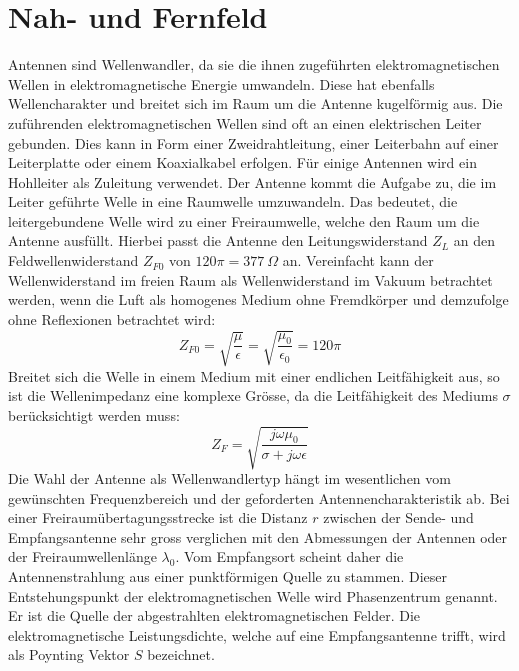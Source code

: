 \newpage
\section{Nah- und Fernfeld}\label{sec:NahundFern}
Antennen sind Wellenwandler, da sie die ihnen zugeführten elektromagnetischen Wellen in elektromagnetische Energie umwandeln. Diese hat ebenfalls Wellencharakter und breitet sich im Raum um die Antenne kugelförmig aus. Die zuführenden elektromagnetischen Wellen sind oft an einen elektrischen Leiter gebunden. Dies kann in Form einer Zweidrahtleitung, einer Leiterbahn auf einer Leiterplatte oder einem Koaxialkabel erfolgen. Für einige Antennen wird ein Hohlleiter als Zuleitung verwendet. 
Der Antenne kommt die Aufgabe zu, die im Leiter geführte Welle in eine Raumwelle umzuwandeln. Das bedeutet, die leitergebundene Welle wird zu einer Freiraumwelle, welche den Raum um die Antenne ausfüllt.
Hierbei passt die Antenne den Leitungswiderstand $Z_{L}$ an den Feldwellenwiderstand $Z_{F0}$ von $120\pi = 377 \ \Omega$ an. Vereinfacht kann der Wellenwiderstand im freien Raum als Wellenwiderstand im Vakuum betrachtet werden, wenn die Luft als homogenes Medium ohne Fremdkörper und demzufolge ohne Reflexionen betrachtet wird:
\begin{equation}\label{eq:Wellenimpedanz}
Z_{F0}=\sqrt{\dfrac{\mu}{\epsilon}}=\sqrt{\dfrac{\mu_{0}}{\epsilon_{0}}}=120\pi
\end{equation}
Breitet sich die Welle in einem Medium mit einer endlichen Leitfähigkeit aus, so ist die Wellenimpedanz eine komplexe Grösse, da die Leitfähigkeit des Mediums $\sigma$ berücksichtigt werden muss:
\begin{equation}\label{eq:Wellenimpedanz_Leitung}
Z_{F}=\sqrt{\dfrac{j\omega\mu_{0}}{\sigma+j\omega\epsilon}}
\end{equation}
Die Wahl der Antenne als Wellenwandlertyp hängt im wesentlichen vom gewünschten Frequenzbereich und der geforderten Antennencharakteristik ab. Bei einer Freiraumübertagungsstrecke ist die Distanz $r$ zwischen der Sende- und Empfangsantenne sehr gross verglichen mit den Abmessungen der Antennen oder der Freiraumwellenlänge $\lambda_{0}$. Vom Empfangsort scheint daher die Antennenstrahlung aus einer punktförmigen Quelle zu stammen. Dieser Entstehungspunkt der elektromagnetischen Welle wird Phasenzentrum genannt. Er ist die Quelle der abgestrahlten elektromagnetischen Felder. Die elektromagnetische Leistungsdichte, welche auf eine Empfangsantenne trifft, wird als Poynting Vektor $S$ bezeichnet.\\
